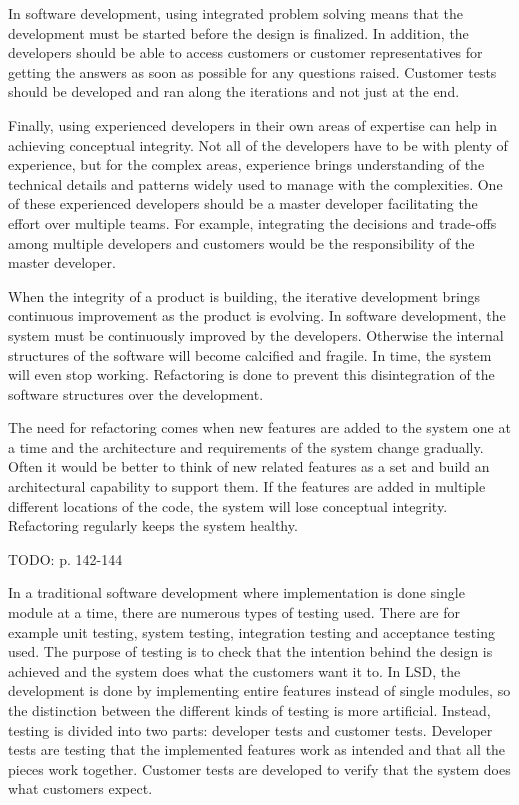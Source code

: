 In software development, using integrated problem solving means that the development must be started before the design is finalized. In addition, the developers should be able to access customers or customer representatives for getting the answers as soon as possible for any questions raised. Customer tests should be developed and ran along the iterations and not just at the end.

Finally, using experienced developers in their own areas of expertise can help in achieving conceptual integrity. Not all of the developers have to be with plenty of experience, but for the complex areas, experience brings understanding of the technical details and patterns widely used to manage with the complexities. One of these experienced developers should be a master developer facilitating the effort over multiple teams. For example, integrating the decisions and trade-offs among multiple developers and customers would be the responsibility of the master developer.

When the integrity of a product is building, the iterative development brings continuous improvement as the product is evolving. In software development, the system must be continuously improved by the developers. Otherwise the internal structures of the software will become calcified and fragile. In time, the system will even stop working. Refactoring is done to prevent this disintegration of the software structures over the development.

The need for refactoring comes when new features are added to the system one at a time and the architecture and requirements of the system change gradually. Often it would be better to think of new related features as a set and build an architectural capability to support them. If the features are added in multiple different locations of the code, the system will lose conceptual integrity. Refactoring regularly keeps the system healthy.

TODO: p. 142-144

In a traditional software development where implementation is done single module at a time, there are numerous types of testing used. There are for example unit testing, system testing, integration testing and acceptance testing used. The purpose of testing is to check that the intention behind the design is achieved and the system does what the customers want it to. In LSD, the development is done by implementing entire features instead of single modules, so the distinction between the different kinds of testing is more artificial. Instead, testing is divided into two parts: developer tests and customer tests. Developer tests are testing that the implemented features work as intended and that all the pieces work together. Customer tests are developed to verify that the system does what customers expect.

